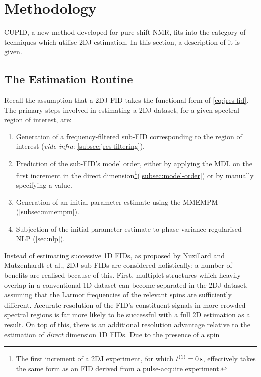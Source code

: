 \section{Methodology}
\ac{CUPID}, a new method developed for pure shift \ac{NMR}, fits into the category
of techniques which utilise \ac{2DJ} estimation. In this section, a description
of it is given.

\subsection{The Estimation Routine}
Recall the assumption that a \ac{2DJ} \ac{FID} takes the functional form
of \cref{eq:jres-fid}. The primary steps involved in estimating a \ac{2DJ}
dataset, for a given spectral region of interest, are:
\begin{enumerate}
    \item Generation of a frequency-filtered sub-\ac{FID} corresponding to
        the region of interest (\textit{vide infra}:
        \cref{subsec:jres-filtering}).
    \item Prediction of the sub-\ac{FID}'s model order, either by applying the
        \ac{MDL} on the first increment in the direct dimension\footnote{
            The first increment of a \ac{2DJ} experiment, for which $t^{(1)} =
            \qty{0}{\second}$, effectively takes the same form as an \ac{FID}
            derived from a pulse-acquire experiment.
        }(\cref{subsec:model-order}) or
        by manually specifying a
        value.
    \item Generation of an initial parameter estimate using the \ac{MMEMPM}
        (\cref{subsec:mmempm}).
    \item Subjection of the initial parameter estimate to phase
        variance-regularised \ac{NLP} (\cref{sec:nlp}).
\end{enumerate}
Instead of estimating successive \ac{1D} \acp{FID}, as proposed by
Nuzillard and Mutzenhardt et al., \ac{2DJ} sub-\acp{FID} are considered
holistically; a number of benefits are realised because of this.
First, multiplet structures which heavily overlap in a
conventional \ac{1D} dataset can become separated in the \ac{2DJ} dataset,
assuming that the Larmor frequencies of the relevant spins are sufficiently
different.
Accurate resolution of the \ac{FID}'s constituent signals in more crowded spectral
regions is far more likely to be successful with a full \ac{2D} estimation as a
result.
On top of this, there is an additional resolution advantage relative to the
estimation of \emph{direct} dimension \ac{1D} \acp{FID}. Due to the presence of a spin
